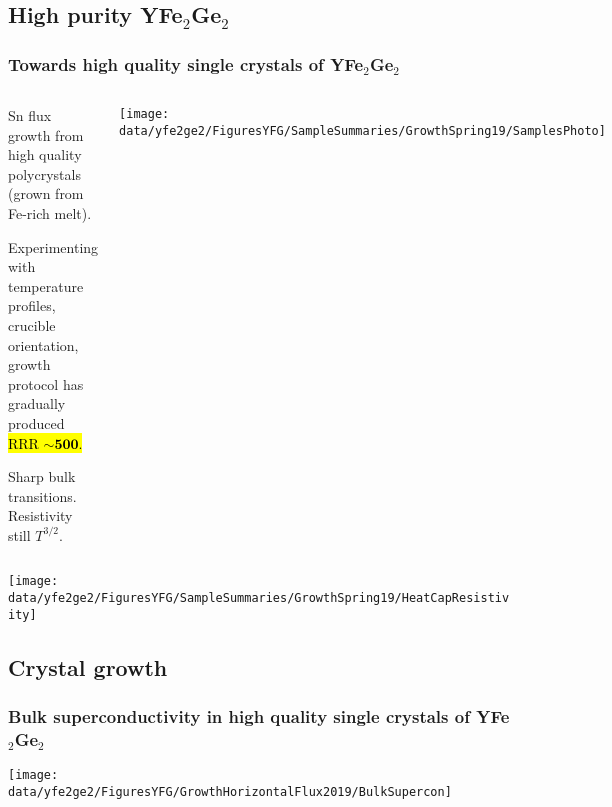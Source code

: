 \subsection{High purity YFe$_2$Ge$_2$}
\begin{frame}[label=YFGThirdGen]
\frametitle{Towards high quality single crystals of YFe$_2$Ge$_2$}

\begin{columns}[T]
\begin{itemize}
\item
{\small Sn flux growth from high quality polycrystals (grown from Fe-rich melt).

\item
Experimenting with temperature profiles, crucible orientation, growth protocol has gradually produced \hl{RRR $\mathbf{\sim 500}$.}

\item
Sharp bulk transitions. Resistivity still $T^{3/2}$. }
\end{itemize}

\centerline{\texttt{[image: \\data/yfe2ge2/FiguresYFG/SampleSummaries/GrowthSpring19/SamplesPhoto]}}
\end{columns}

\vspace{1em}
{\texttt{[image: \\data/yfe2ge2/FiguresYFG/SampleSummaries/GrowthSpring19/HeatCapResistivity]}}


\end{frame}

\subsection{Crystal growth}
\begin{frame}[plain,label=YFGBulkSupercon]
\frametitle{Bulk superconductivity in high quality single crystals of YFe$_2$Ge$_2$}
\texttt{[image: \\data/yfe2ge2/FiguresYFG/GrowthHorizontalFlux2019/BulkSupercon]}
\end{frame}


